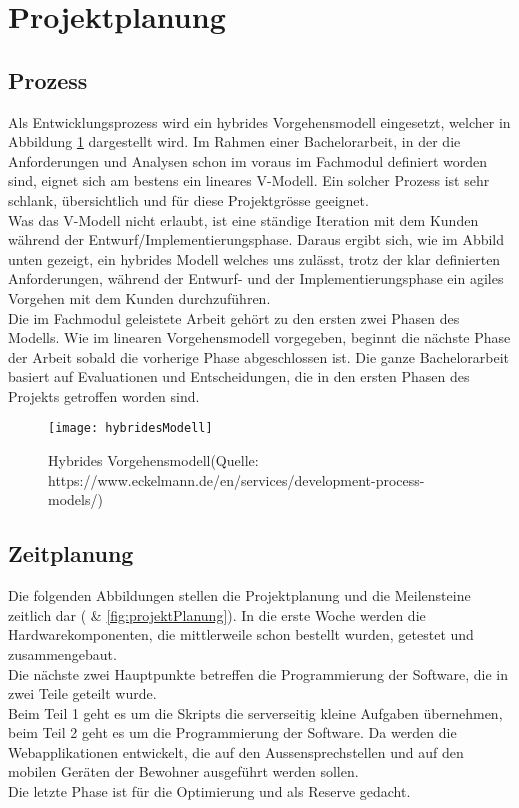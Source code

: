 \section{Projektplanung}
\label{sec:chapterexample}

\subsection{Prozess}
\label{sec:chapterexample}
Als Entwicklungsprozess wird ein hybrides Vorgehensmodell eingesetzt, welcher in Abbildung \ref{fig:hybridesModell} dargestellt wird. Im Rahmen einer Bachelorarbeit, in der die Anforderungen und Analysen schon im voraus im Fachmodul definiert worden sind, eignet sich am bestens ein lineares V-Modell. Ein solcher Prozess ist sehr schlank, übersichtlich und für diese Projektgrösse geeignet.
\\
Was das V-Modell nicht erlaubt, ist eine ständige Iteration mit dem Kunden während der Entwurf/Implementierungsphase. Daraus ergibt sich, wie im Abbild unten gezeigt, ein hybrides Modell welches uns zulässt, trotz der klar definierten Anforderungen, während der Entwurf- und der Implementierungsphase ein agiles Vorgehen mit dem Kunden durchzuführen.
\\
Die im Fachmodul geleistete Arbeit gehört zu den ersten zwei Phasen des Modells. Wie im linearen Vorgehensmodell vorgegeben, beginnt die nächste Phase der Arbeit sobald die vorherige Phase abgeschlossen ist. Die ganze Bachelorarbeit basiert auf Evaluationen und Entscheidungen, die in den ersten Phasen des Projekts getroffen worden sind. 

\begin{figure}[htb!]
	\begin{center}
		\texttt{[image: hybridesModell]}
		\caption[Hybrides Vorgehensmodell]{Hybrides Vorgehensmodell(Quelle: https://www.eckelmann.de/en/services/development-process-models/)}
		\label{fig:hybridesModell}
	\end{center}
\end{figure}


\subsection{Zeitplanung}
\label{sec:zeitplanung}
Die folgenden Abbildungen stellen die Projektplanung und die Meilensteine zeitlich dar ( \& \cref{fig:projektPlanung}). In die erste Woche werden die Hardwarekomponenten, die mittlerweile schon bestellt wurden, getestet und zusammengebaut. 
\\
Die nächste zwei Hauptpunkte betreffen die Programmierung der  Software, die in zwei Teile geteilt wurde.
\\ 
Beim Teil 1 geht es um die Skripts die serverseitig kleine Aufgaben übernehmen, beim Teil 2 geht es um die Programmierung der Software. Da werden die Webapplikationen entwickelt, die auf den Aussensprechstellen und auf den mobilen Geräten der Bewohner ausgeführt werden sollen.
\\
Die letzte Phase ist für die Optimierung und als Reserve gedacht.

